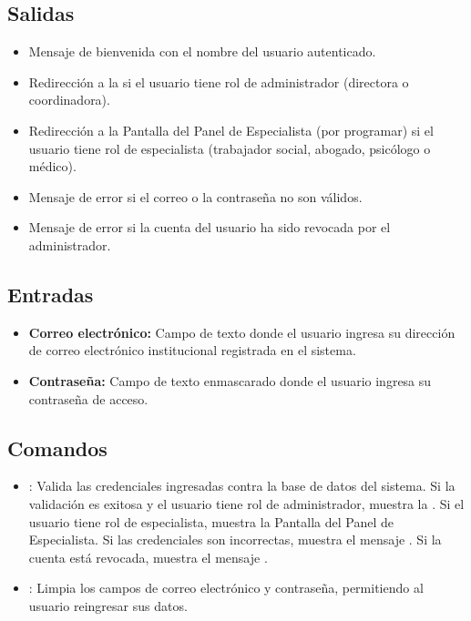 
\subsection{Salidas}
\begin{itemize}
	\item Mensaje de bienvenida con el nombre del usuario autenticado.
	\item Redirección a la  si el usuario tiene rol de administrador 
	(directora o coordinadora).
	\item Redirección a la Pantalla del Panel de 
	Especialista (por programar) si el usuario tiene rol de especialista 
	(trabajador social, abogado, psicólogo o médico).
	\item Mensaje de error  
	si el correo o la contraseña no son válidos.
	\item Mensaje de error  si la 
	cuenta del usuario ha sido revocada por el administrador.
\end{itemize}

\subsection{Entradas}
\begin{itemize}
	\item \textbf{Correo electrónico:} Campo de texto donde el usuario 
	ingresa su dirección de correo electrónico institucional registrada 
	en el sistema.
	\item \textbf{Contraseña:} Campo de texto enmascarado donde el 
	usuario ingresa su contraseña de acceso.
\end{itemize}

\subsection{Comandos}
\begin{itemize}
	\item {}: Valida las credenciales ingresadas 
	contra la base de datos del sistema. Si la validación es exitosa 
	y el usuario tiene rol de administrador, muestra la 
	. Si el usuario 
	tiene rol de especialista, muestra la 
	Pantalla del Panel de Especialista. Si las 
	credenciales son incorrectas, muestra el mensaje 
	. Si la cuenta está 
	revocada, muestra el mensaje .
	
	\item {}: Limpia los campos de correo electrónico 
	y contraseña, permitiendo al usuario reingresar sus datos.
\end{itemize}


